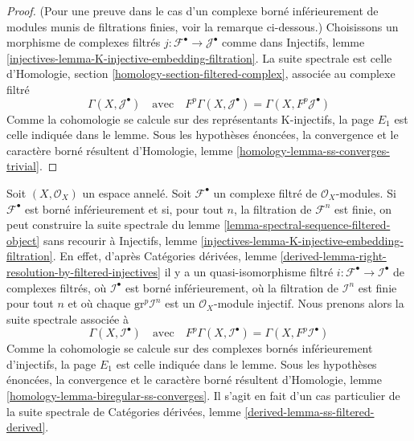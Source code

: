 \begin{proof}
(Pour une preuve dans le cas d'un complexe borné inférieurement de modules munis de filtrations finies, voir la remarque ci-dessous.) Choisissons un morphisme de complexes filtrés $j : \mathcal{F}^\bullet \to \mathcal{J}^\bullet$ comme dans Injectifs, lemme \ref{injectives-lemma-K-injective-embedding-filtration}. La suite spectrale est celle d'Homologie, section \ref{homology-section-filtered-complex}, associée au complexe filtré $$
\Gamma(X, \mathcal{J}^\bullet)
\quad\text{avec}\quad
F^p\Gamma(X, \mathcal{J}^\bullet) = \Gamma(X, F^p\mathcal{J}^\bullet)
$$ Comme la cohomologie se calcule sur des représentants K-injectifs, la page $E_1$ est celle indiquée dans le lemme. Sous les hypothèses énoncées, la convergence et le caractère borné résultent d'Homologie, lemme \ref{homology-lemma-ss-converges-trivial}.
\end{proof}

\begin{remark}

\label{remark-spectral-sequence-filtered-object}

Soit $(X, \mathcal{O}_X)$ un espace annelé. Soit $\mathcal{F}^\bullet$ un complexe filtré de $\mathcal{O}_X$-modules. Si $\mathcal{F}^\bullet$
est borné inférieurement et si, pour tout $n$, la filtration de $\mathcal{F}^n$
est finie, on peut construire la suite spectrale du lemme \ref{lemma-spectral-sequence-filtered-object}
sans recourir à Injectifs, lemme
\ref{injectives-lemma-K-injective-embedding-filtration}. En effet, d'après Catégories dérivées, lemme
\ref{derived-lemma-right-resolution-by-filtered-injectives}
il y a un quasi-isomorphisme filtré
$i : \mathcal{F}^\bullet \to \mathcal{I}^\bullet$
de complexes filtrés, où $\mathcal{I}^\bullet$ est borné inférieurement, où la filtration de $\mathcal{I}^n$ est finie pour tout $n$ et où chaque $\text{gr}^p\mathcal{I}^n$ est un $\mathcal{O}_X$-module injectif. Nous prenons alors la suite spectrale associée à
$$
\Gamma(X, \mathcal{I}^\bullet)
\quad\text{avec}\quad
F^p\Gamma(X, \mathcal{I}^\bullet) = \Gamma(X, F^p\mathcal{I}^\bullet)
$$
Comme la cohomologie se calcule sur des complexes bornés inférieurement d'injectifs, la page $E_1$ est celle indiquée dans le lemme. Sous les hypothèses énoncées, la convergence et le caractère borné résultent d'Homologie, lemme \ref{homology-lemma-biregular-ss-converges}. Il s'agit en fait d'un cas particulier de la suite spectrale de Catégories dérivées, lemme \ref{derived-lemma-ss-filtered-derived}.

\end{remark}

